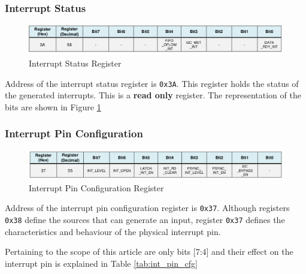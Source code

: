 \documentclass{article}
\begin{document}
    \subsubsection{Interrupt Status}
    \begin{figure}[h]
    	\centering
    	\includegraphics[width=\textwidth]{figs/reg_int_status.png}
    	\caption{Interrupt Status Register\cite{mpu6050-register-map}}
    	\label{fig:int_status_reg}
    \end{figure}
    Address of the interrupt status register is \texttt{0x3A}. This register holds the status of the generated interrupts. This is a \textbf{read only} register. The representation of the bits are shown in Figure \ref{fig:int_status_reg}
    
    \subsubsection{Interrupt Pin Configuration}
    \label{sec:int_pin_cfg}
    \begin{figure}[h]
    	\centering
    	\includegraphics[width=\textwidth]{figs/reg_int_pin_cfg.png}
    	\caption{Interrupt Pin Configuration Register\cite{mpu6050-register-map}}
    	\label{fig:int_pin_cfg}
    \end{figure}
	 Address of the interrupt pin configuration register is \texttt{0x37}. Although registers \texttt{0x38} define the sources that can generate an input, register \texttt{0x37} defines the characteristics and behaviour of the physical interrupt pin.
	 
	 Pertaining to the scope of this article are only bits [7:4] and their effect on the interrupt pin is explained in Table \ref{tab:int_pin_cfg}
	 
\end{document}

